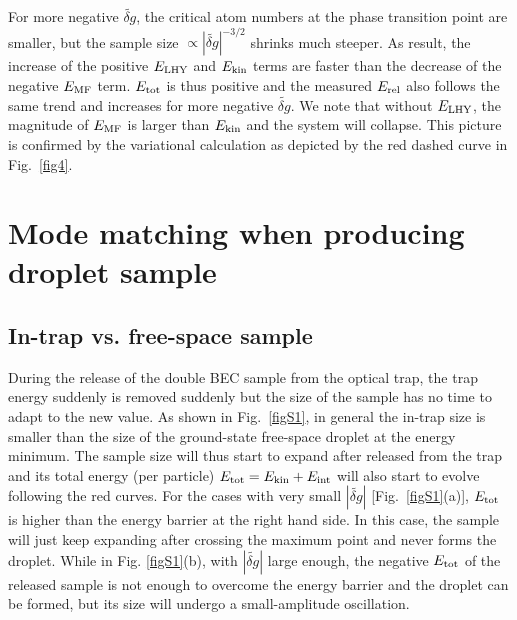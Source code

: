 For more negative $\widetilde{\delta g}$, the critical atom numbers at the phase transition point are smaller, but the sample size $\propto |\widetilde{\delta g}|^{-3/2}$ shrinks much steeper. As result, the increase of the positive $E_{\rm LHY}$ and $E_{\rm kin}$ terms are faster than the decrease of the negative $E_{\rm MF}$ term. $E_{\rm tot}$ is thus positive and the measured $E_{\rm rel}$ also follows the same trend and increases for more negative $\widetilde{\delta g}$. We note that without $E_{\rm LHY}$, the magnitude of $E_{\rm MF}$ is larger than $E_{\rm kin}$ and the system will collapse. This picture is confirmed by the variational calculation as depicted by the red dashed curve in Fig.~\ref{fig4}.   

\section{Mode matching when producing droplet sample}
\label{sec:mode_match}

\subsection{In-trap vs. free-space sample}

During the release of the double BEC sample from the optical trap, the trap energy suddenly is removed suddenly but the size of the sample has no time to adapt to the new value. As shown in Fig.~\ref{figS1}, in general the in-trap size is smaller than the size of the ground-state free-space droplet at the energy minimum. The sample size will thus start to expand after released from the trap and its total energy (per particle) $E_{\rm tot} = E_{\rm kin} + E_{\rm int}$ will also start to evolve following the red curves. For the cases with very small $|\widetilde{\delta g}|$ [Fig.~\ref{figS1}(a)], $E_{\rm tot}$ is higher than the energy barrier at the right hand side. In this case, the sample will just keep expanding after crossing the maximum point and never forms the droplet. While in Fig. \ref{figS1}(b), with $|\widetilde{\delta g}|$ large enough, the negative $E_{\rm tot}$ of the released sample is not enough to overcome the energy barrier and the droplet can be formed, but its size will undergo a small-amplitude oscillation.

